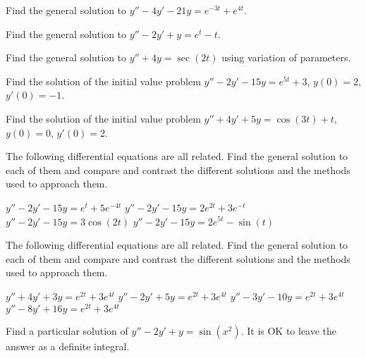 \begin{exercise}
Find the general solution to $y'' - 4y' - 21y = e^{-3t} + e^{4t}$.
\end{exercise}

\begin{exercise}
Find the general solution to $y'' - 2y' + y = e^t - t$.
\end{exercise}

\begin{exercise}
Find the general solution to $y'' + 4y = \sec(2t)$ using variation of parameters.
\end{exercise}

\begin{exercise}
Find the solution of the initial value problem $y'' - 2y' - 15y = e^{5t} + 3$, $y(0) = 2$, $y'(0) = -1$. 
\end{exercise}

\begin{exercise}
Find the solution of the initial value problem $y'' + 4y' + 5y = \cos(3t) + t$, $y(0) = 0$, $y'(0) = 2$.  
\end{exercise}

\begin{exercise}
The following differential equations are all related. Find the general solution to each of them and compare and contrast the different solutions and the methods used to approach them.
\begin{tasks}
\task $y'' - 2y' - 15y = e^t + 5e^{-4t}$
\task $y'' - 2y' - 15y = 2e^{2t} + 3e^{-t}$
\task $y'' - 2y' - 15y = 3\cos(2t)$
\task $y'' - 2y' - 15y = 2e^{5t} - \sin(t)$
\end{tasks}
\end{exercise}

\begin{exercise}
The following differential equations are all related. Find the general solution to each of them and compare and contrast the different solutions and the methods used to approach them.
\begin{tasks}
\task $y'' + 4y' + 3y = e^{2t} + 3e^{4t}$
\task $y'' - 2y' + 5y = e^{2t} + 3e^{4t}$
\task $y'' - 3y' - 10y = e^{2t} + 3e^{4t}$
\task $y'' - 8y'  + 16y = e^{2t} + 3e^{4t}$
\end{tasks}
\end{exercise}

\begin{exercise}
Find a particular solution of
$y''-2y' +y = \sin (x^2)$.  It is OK to leave the answer as a definite
integral.
\end{exercise}

